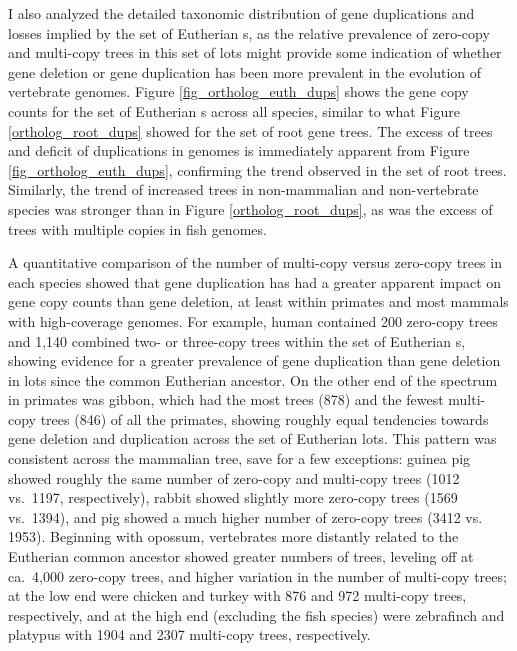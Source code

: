 I also analyzed the detailed taxonomic distribution of gene
duplications and losses implied by the set of Eutherian \subtr{}s, as
the relative prevalence of zero-copy and multi-copy trees in this set
of \acp{lot} might provide some indication of whether gene deletion or
gene duplication has been more prevalent in the evolution of
vertebrate genomes. Figure \ref{fig_ortholog_euth_dups} shows the gene
copy counts for the set of Eutherian \subtr{}s across all \ens
species, similar to what Figure \ref{ortholog_root_dups} showed for
the set of root \cmp gene trees. The excess of \zcop trees and deficit
of duplications in \lcv genomes is immediately apparent from Figure
\ref{fig_ortholog_euth_dups}, confirming the trend observed in the set
of root \cmp trees. Similarly, the trend of increased \zcop trees in
non-mammalian and non-vertebrate species was stronger than in Figure
\ref{ortholog_root_dups}, as was the excess of trees with multiple
copies in fish genomes.

A quantitative comparison of the number of multi-copy versus zero-copy
trees in each species showed that gene duplication has had a greater
apparent impact on gene copy counts than gene deletion, at least
within primates and most mammals with high-coverage genomes. For
example, human contained 200 zero-copy trees and 1,140 combined two-
or three-copy trees within the set of Eutherian \subtr{}s, showing
evidence for a greater prevalence of gene duplication than gene
deletion in \acp{lot} since the common Eutherian ancestor. On the
other end of the spectrum in primates was gibbon, which had the most
\zcop trees (878) and the fewest multi-copy trees (846) of all the
primates, showing roughly equal tendencies towards gene deletion and
duplication across the set of Eutherian \acp{lot}. This pattern was
consistent across the mammalian tree, save for a few exceptions:
guinea pig showed roughly the same number of zero-copy and multi-copy
trees (1012 vs.~1197, respectively), rabbit showed slightly more
zero-copy trees (1569 vs.~1394), and pig showed a much higher number
of zero-copy trees (3412 vs. 1953). Beginning with opossum,
vertebrates more distantly related to the Eutherian common ancestor
showed greater numbers of \zcop trees, leveling off at ca.~4,000
zero-copy trees, and higher variation in the number of multi-copy
trees; at the low end were chicken and turkey with 876 and 972
multi-copy trees, respectively, and at the high end (excluding the
fish species) were zebrafinch and platypus with 1904 and 2307
multi-copy trees, respectively.

